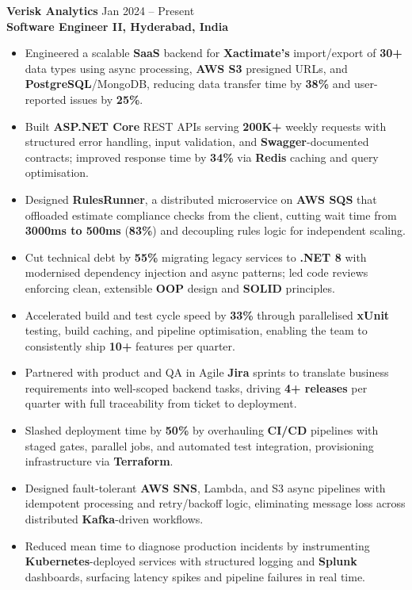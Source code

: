 \documentclass[a4paper,10pt]{article}
\begin{document}
\textbf{Verisk Analytics} \hfill Jan 2024 -- Present \\
\textbf{Software Engineer II, Hyderabad, India}
\begin{itemize}[leftmargin=*]
    \item Engineered a scalable \textbf{SaaS} backend for \textbf{Xactimate's} import/export of \textbf{30+} data types using async processing, \textbf{AWS S3} presigned URLs, and \textbf{PostgreSQL}/MongoDB, reducing data transfer time by \textbf{38\%} and user-reported issues by \textbf{25\%}.
    \item Built \textbf{ASP.NET Core} REST APIs serving \textbf{200K+} weekly requests with structured error handling, input validation, and \textbf{Swagger}-documented contracts; improved response time by \textbf{34\%} via \textbf{Redis} caching and query optimisation.
    \item Designed \textbf{RulesRunner}, a distributed microservice on \textbf{AWS SQS} that offloaded estimate compliance checks from the client, cutting wait time from \textbf{3000ms to 500ms} (\textbf{83\%}) and decoupling rules logic for independent scaling.
    \item Cut technical debt by \textbf{55\%} migrating legacy services to \textbf{.NET 8} with modernised dependency injection and async patterns; led code reviews enforcing clean, extensible \textbf{OOP} design and \textbf{SOLID} principles.
    \item Accelerated build and test cycle speed by \textbf{33\%} through parallelised \textbf{xUnit} testing, build caching, and pipeline optimisation, enabling the team to consistently ship \textbf{10+} features per quarter.
    \item Partnered with product and QA in Agile \textbf{Jira} sprints to translate business requirements into well-scoped backend tasks, driving \textbf{4+ releases} per quarter with full traceability from ticket to deployment.
    \item Slashed deployment time by \textbf{50\%} by overhauling \textbf{CI/CD} pipelines with staged gates, parallel jobs, and automated test integration, provisioning infrastructure via \textbf{Terraform}.
    \item Designed fault-tolerant \textbf{AWS SNS}, Lambda, and S3 async pipelines with idempotent processing and retry/backoff logic, eliminating message loss across distributed \textbf{Kafka}-driven workflows.
    \item Reduced mean time to diagnose production incidents by instrumenting \textbf{Kubernetes}-deployed services with structured logging and \textbf{Splunk} dashboards, surfacing latency spikes and pipeline failures in real time.
\end{itemize}
\end{document}
